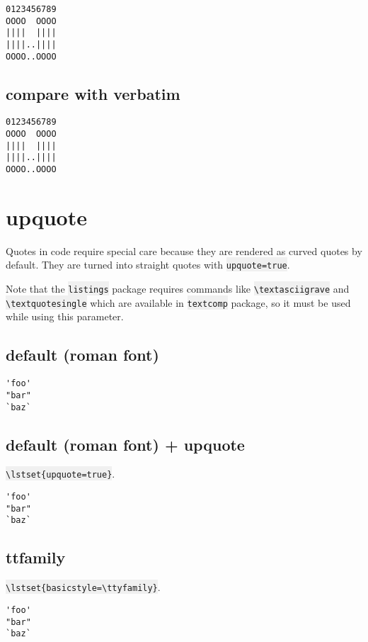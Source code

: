 \documentclass{article}
\newcommand{\bs}{\textbackslash}
\newcommand{\ttt}[1]{\colorbox[HTML]{f0f0f0}{\texttt{#1}}}
\begin{document}
{
\lstset{basicstyle=\ttfamily, columns=fullflexible, keepspaces=true}
\begin{lstlisting}
0123456789
OOOO  OOOO
||||  ||||
||||..||||
OOOO..OOOO
\end{lstlisting}
}

\subsection{compare with verbatim}
\begin{verbatim}
0123456789
OOOO  OOOO
||||  ||||
||||..||||
OOOO..OOOO
\end{verbatim}
\pagebreak


\section{upquote}
Quotes in code require special care because they are rendered as curved
quotes by default. They are turned into straight quotes with
\ttt{upquote=true}.

Note that the \ttt{listings} package requires commands like
\ttt{\bs{}textasciigrave} and \ttt{\bs{}textquotesingle} which are
available in \ttt{textcomp} package, so it must be used while using this
parameter.

\subsection{default (roman font)}
{
\begin{lstlisting}
'foo'
"bar"
`baz`
\end{lstlisting}
}

\subsection{default (roman font) + upquote}
\ttt{\bs{}lstset\{upquote=true\}}.

{
\lstset{upquote=true}
\begin{lstlisting}
'foo'
"bar"
`baz`
\end{lstlisting}
}

\subsection{ttfamily}
\ttt{\bs{}lstset\{basicstyle=\bs{}ttyfamily\}}.

{
\lstset{basicstyle=\ttfamily}
\begin{lstlisting}
'foo'
"bar"
`baz`
\end{lstlisting}
}
\end{document}
